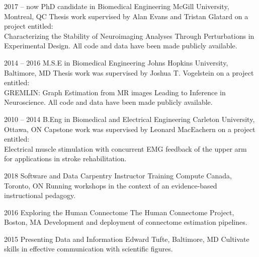 \documentclass[]{friggeri-cv} %
\begin{document}
\begin{entrylist}


\entry
{2017 -- now}
{PhD candidate {\normalfont in Biomedical Engineering}}
{McGill University, Montreal, QC}
{Thesis work supervised by Alan Evans and Tristan Glatard on a project entitled:\\ Characterizing the Stability of
Neuroimaging Analyses Through Perturbations in Experimental Design.
All code and data have been made publicly available.}


\entry
{2014 -- 2016}
{M.S.E {\normalfont in Biomedical Engineering}}
{Johns Hopkins University, Baltimore, MD}
{Thesis work was supervised by Joshua T. Vogelstein on a project entitled:\\GREMLIN:
Graph Estimation from MR images Leading to Inference in Neuroscience. All code and data have
been made publicly available.}


\entry
{2010 -- 2014}
{B.Eng {\normalfont in Biomedical and Electrical Engineering}}
{Carleton University, Ottawa, ON}
{Capstone work was supervised by Leonard MacEachern on a project entitled:\\Electrical
muscle stimulation with concurrent EMG feedback of the upper arm for applications in stroke
rehabilitation.}


\entry
{2018}
{Software and Data Carpentry Instructor Training}
{Compute Canada, Toronto, ON}
{Running workshops in the context of an evidence-based instructional pedagogy.}


\entry
{2016}
{Exploring the Human Connectome}
{The Human Connectome Project, Boston, MA}
{Development and deployment of connectome estimation pipelines.}


\entry
{2015}
{Presenting Data and Information}
{Edward Tufte, Baltimore, MD}
{Cultivate skills in effective communication with scientific figures.}

\end{entrylist}

\end{document}
